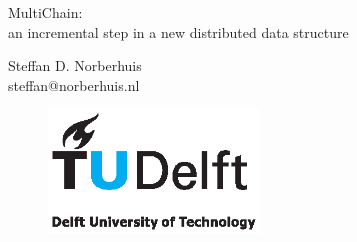 \begin{titlepage}

\null\vfill

\begin{center}
\LARGE{MultiChain:\\
       		an incremental step in a new distributed data structure}
\end{center}

\vspace{1.5cm}

\begin{center}
Steffan D. Norberhuis\\
steffan@norberhuis.nl
\end{center}

\vfill

\begin{figure}[!b]
\centering
\includegraphics[width={0.5\textwidth}]{pics/TUD_logo_color.eps}
\end{figure}

\vspace{2.0cm}

\end{titlepage}
